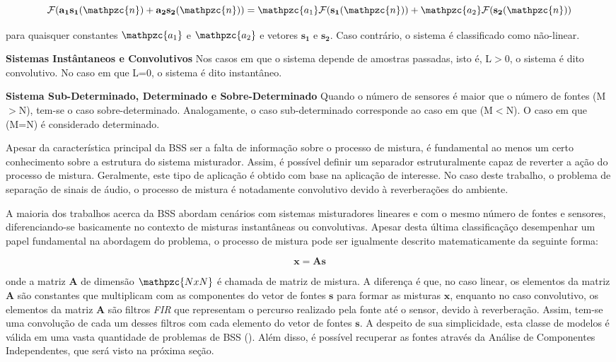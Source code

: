         \begin{equation}\label{eq:linearity}
            \mathcal{F}(\mathbf{a_1}\mathbf{s_1}(\mathpzc{n}) + \mathbf{a_2}\mathbf{s_2}(\mathpzc{n})) = \mathpzc{a_1}\mathcal{F}(\mathbf{s_1}(\mathpzc{n})) + \mathpzc{a_2}\mathcal{F}(\mathbf{s_2}(\mathpzc{n}))
        \end{equation}

    para quaisquer constantes $\mathpzc{a_1}$ e $\mathpzc{a_2}$ e vetores $\mathbf{s_1}$ e $\mathbf{s_2}$. Caso contrário, o sistema é classificado como não-linear. 
    
     \textbf{Sistemas Instântaneos e Convolutivos} Nos casos em que o sistema depende de amostras passadas, isto é, L$>$0, o sistema é dito convolutivo. No caso em que L=0, o sistema é dito instantâneo.
    
     \textbf{Sistema Sub-Determinado, Determinado e Sobre-Determinado} Quando o número de sensores é maior que o número de fontes (M$>$N), tem-se o caso sobre-determinado. Analogamente, o caso sub-determinado corresponde ao caso em que (M$<$N). O caso em que (M=N) é considerado determinado.
     
     Apesar da característica principal da BSS ser a falta de informação sobre o processo de mistura, é fundamental ao menos um certo conhecimento sobre a estrutura do sistema misturador. Assim, é possível definir um separador estruturalmente capaz de reverter a ação do processo de mistura. Geralmente, este tipo de aplicação é obtido com base na aplicação de interesse. No caso deste trabalho, o problema de separação de sinais de áudio, o processo de mistura é notadamente convolutivo devido à reverberações do ambiente.
     
     A maioria dos trabalhos acerca da BSS abordam cenários com sistemas misturadores lineares e com o mesmo número de fontes e sensores, diferenciando-se basicamente no contexto de misturas instantâneas ou convolutivas. Apesar desta última classificaçãço desempenhar um papel fundamental na abordagem do problema, o  processo de mistura pode ser igualmente descrito matematicamente da seguinte forma:
     
     \begin{equation}\label{eq:xn}
        \mathbf{x} = \mathbf{A}\mathbf{s}
    \end{equation}
    
    onde a matriz $\mathbf{A}$ de dimensão $\mathpzc{N x N}$ é chamada de matriz de mistura. A diferença é que, no caso linear, os elementos da matriz $\mathbf{A}$ são constantes que multiplicam com as componentes do vetor de fontes $\mathbf{s}$ para formar as misturas $\mathbf{x}$, enquanto no caso convolutivo, os elementos da matriz $\mathbf{A}$ são filtros \textit{FIR} que representam o percurso realizado pela fonte até o sensor, devido à reverberação. Assim, tem-se uma convolução de cada um desses filtros com cada elemento do vetor de fontes $\mathbf{s}$. A despeito de sua simplicidade, esta classe de modelos é válida em uma vasta quantidade de problemas de BSS (\cite{ICA}). Além disso, é possível recuperar as fontes através da Análise de Componentes Independentes, que será visto na próxima seção.

